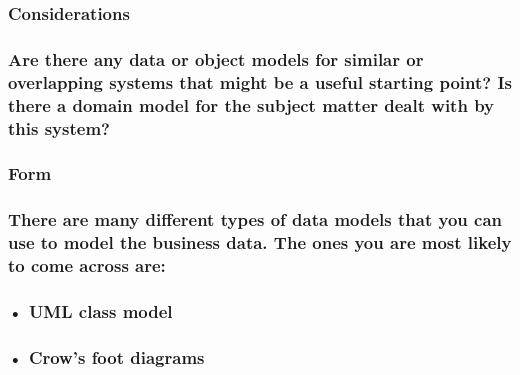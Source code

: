 \documentclass[
]{article}
\begin{document}
\hypertarget{considerations-15}{%
\subsubsection{Considerations}\label{considerations-15}}

\hypertarget{are-there-any-data-or-object-models-for-similar-or-overlapping-systems-that-might-be-a-useful-starting-point-is-there-a-domain-model-for-the-subject-matter-dealt-with-by-this-system}{%
\subsubsection{Are there any data or object models for similar or
overlapping systems that might be a useful starting point? Is there a
domain model for the subject matter dealt with by this
system?}\label{are-there-any-data-or-object-models-for-similar-or-overlapping-systems-that-might-be-a-useful-starting-point-is-there-a-domain-model-for-the-subject-matter-dealt-with-by-this-system}}

\hypertarget{form-24}{%
\subsubsection{Form}\label{form-24}}

\hypertarget{there-are-many-different-types-of-data-models-that-you-can-use-to-model-the-business-data.-the-ones-you-are-most-likely-to-come-across-are}{%
\subsubsection{\texorpdfstring{There are many different types of data
models that you can use to model the business data. The ones you are
most likely to come across are:
}{There are many different types of data models that you can use to model the business data. The ones you are most likely to come across are: }}\label{there-are-many-different-types-of-data-models-that-you-can-use-to-model-the-business-data.-the-ones-you-are-most-likely-to-come-across-are}}

\hypertarget{uml-class-model}{%
\subsubsection{\texorpdfstring{• UML class model
}{• UML class model }}\label{uml-class-model}}

\hypertarget{crows-foot-diagrams}{%
\subsubsection{• Crow's foot diagrams}\label{crows-foot-diagrams}}
\end{document}
